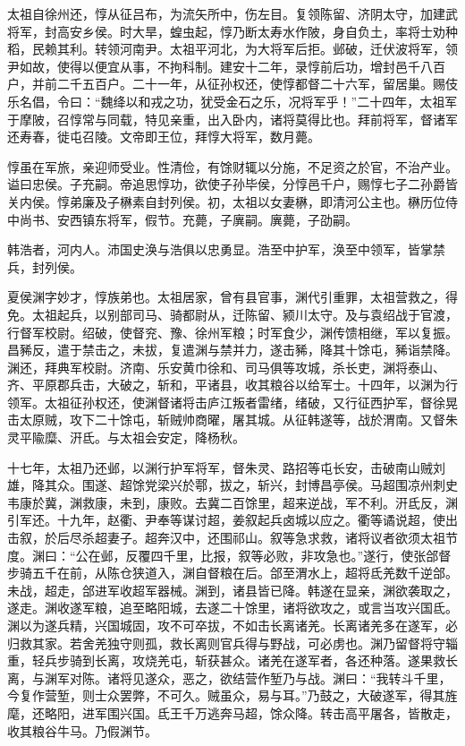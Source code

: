 \documentclass[12pt,UTF8]{ctexbook}
\begin{document}
太祖自徐州还，惇从征吕布，为流矢所中，伤左目。复领陈留、济阴太守，加建武将军，封高安乡侯。时大旱，蝗虫起，惇乃断太寿水作陂，身自负土，率将士劝种稻，民赖其利。转领河南尹。太祖平河北，为大将军后拒。邺破，迁伏波将军，领尹如故，使得以便宜从事，不拘科制。建安十二年，录惇前后功，增封邑千八百户，并前二千五百户。二十一年，从征孙权还，使惇都督二十六军，留居巢。赐伎乐名倡，令曰：“魏绛以和戎之功，犹受金石之乐，况将军乎！”二十四年，太祖军于摩陂，召惇常与同载，特见亲重，出入卧内，诸将莫得比也。拜前将军，督诸军还寿春，徙屯召陵。文帝即王位，拜惇大将军，数月薨。

惇虽在军旅，亲迎师受业。性清俭，有馀财辄以分施，不足资之於官，不治产业。谥曰忠侯。子充嗣。帝追思惇功，欲使子孙毕侯，分惇邑千户，赐惇七子二孙爵皆关内侯。惇弟廉及子楙素自封列侯。初，太祖以女妻楙，即清河公主也。楙历位侍中尚书、安西镇东将军，假节。充薨，子廙嗣。廙薨，子劭嗣。

韩浩者，河内人。沛国史涣与浩俱以忠勇显。浩至中护军，涣至中领军，皆掌禁兵，封列侯。

夏侯渊字妙才，惇族弟也。太祖居家，曾有县官事，渊代引重罪，太祖营救之，得免。太祖起兵，以别部司马、骑都尉从，迁陈留、颍川太守。及与袁绍战于官渡，行督军校尉。绍破，使督兖、豫、徐州军粮；时军食少，渊传馈相继，军以复振。昌豨反，遣于禁击之，未拔，复遣渊与禁并力，遂击豨，降其十馀屯，豨诣禁降。渊还，拜典军校尉。济南、乐安黄巾徐和、司马俱等攻城，杀长吏，渊将泰山、齐、平原郡兵击，大破之，斩和，平诸县，收其粮谷以给军士。十四年，以渊为行领军。太祖征孙权还，使渊督诸将击庐江叛者雷绪，绪破，又行征西护军，督徐晃击太原贼，攻下二十馀屯，斩贼帅商曜，屠其城。从征韩遂等，战於渭南。又督朱灵平隃糜、汧氐。与太祖会安定，降杨秋。

十七年，太祖乃还邺，以渊行护军将军，督朱灵、路招等屯长安，击破南山贼刘雄，降其众。围遂、超馀党梁兴於鄠，拔之，斩兴，封博昌亭侯。马超围凉州刺史韦康於冀，渊救康，未到，康败。去冀二百馀里，超来逆战，军不利。汧氐反，渊引军还。十九年，赵衢、尹奉等谋讨超，姜叙起兵卤城以应之。衢等谲说超，使出击叙，於后尽杀超妻子。超奔汉中，还围祁山。叙等急求救，诸将议者欲须太祖节度。渊曰：“公在邺，反覆四千里，比报，叙等必败，非攻急也。”遂行，使张郃督步骑五千在前，从陈仓狭道入，渊自督粮在后。郃至渭水上，超将氐羌数千逆郃。未战，超走，郃进军收超军器械。渊到，诸县皆已降。韩遂在显亲，渊欲袭取之，遂走。渊收遂军粮，追至略阳城，去遂二十馀里，诸将欲攻之，或言当攻兴国氐。渊以为遂兵精，兴国城固，攻不可卒拔，不如击长离诸羌。长离诸羌多在遂军，必归救其家。若舍羌独守则孤，救长离则官兵得与野战，可必虏也。渊乃留督将守辎重，轻兵步骑到长离，攻烧羌屯，斩获甚众。诸羌在遂军者，各还种落。遂果救长离，与渊军对陈。诸将见遂众，恶之，欲结营作堑乃与战。渊曰：“我转斗千里，今复作营堑，则士众罢弊，不可久。贼虽众，易与耳。”乃鼓之，大破遂军，得其旌麾，还略阳，进军围兴国。氐王千万逃奔马超，馀众降。转击高平屠各，皆散走，收其粮谷牛马。乃假渊节。
\end{document}
